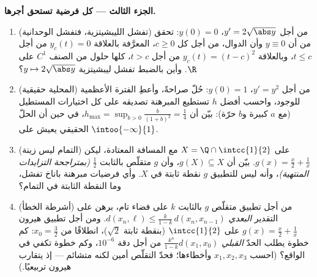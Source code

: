 \begin{problem}
\medskip
\noindent\textbf{الجزء الثالث --- كل فرضية تستحق أجرها.}
\begin{enumerate}[resume]
  \item (تفشل الليبشيتزية، فتفشل الوحدانية) من أجل $y' =
        2\sqrt{\abs y}$، $y(0) = 0$: تحقق من أن $y \equiv 0$
        وأن الدوال، من أجل كل $c \geq 0$، المعرَّفة بالعلاقة $y_c(t) = 0$ من أجل
        $t \leq c$، وبالعلاقة $y_c(t) = (t - c)^2$ من أجل $t > c$، كلها
        حلول من الصنف $C^1$ على $\R$. وأين بالضبط تفشل ليبشيتزية $y \mapsto
        2\sqrt{\abs y}$؟
  \item (المحلية حقيقية) من أجل $y' = y^2$، $y(0) = 1$: حُلّ
        صراحةً، وأعطِ الفترة الأعظمية للوجود،
        واحسب أفضل $h$ تستطيع المبرهنة تصديقه على كل
        اختيارات المستطيل (مع $a$ كبيرة و$b$ حرّة): بيّن أن
        $h_{\max} = \sup_{b>0} \frac{b}{(1+b)^2} = \frac14$،
        في حين أن الحلّ الحقيقي يعيش على $\intoo{-\infty}{1}$.
  \item (التمام ليس زينة) على $X = \Q \cap
        \intcc{1}{2}$ مع المسافة المعتادة، ليكن $g(x) =
        \frac x2 + \frac1x$. بيّن أن $g(X) \subseteq X$، وأن $g$
        متقلّص بالثابت $\frac12$ \emph{(بمتراجحة التزايدات
        المنتهية)}، وأنه ليس للتطبيق $g$ نقطة ثابتة في $X$.
        وأي فرضيات مبرهنة باناخ تفشل، وما النقطة الثابتة
        في التمام؟
  \item (أشرطة الخطأ) من أجل تطبيق متقلّص $g$ بالثابت $k$ على فضاء
        تام، برهن على التقدير \emph{البعدي} $d(x_n,
        \ell) \leq \frac{k}{1-k}\,d(x_n, x_{n-1})$. ومن أجل تطبيق هيرون
        $g(x) = \frac x2 + \frac 1x$ على $\intcc{1}{2}$
        (بنقطة ثابتة $\sqrt2$)، انطلاقًا من $x_0 = \frac32$:
        كم خطوة يطلب الحدّ \emph{القبلي}
        $\frac{k^n}{1-k}d(x_1, x_0)$ من أجل دقة
        $10^{-6}$، وكم خطوة تكفي في الواقع؟
        (احسب $x_1, x_2, x_3$ وأخطاءها؛ فحدّ التقلّص
        أمين لكنه متشائم --- إذ يتقارب هيرون
        تربيعيًا.)
\end{enumerate}


\end{problem}
